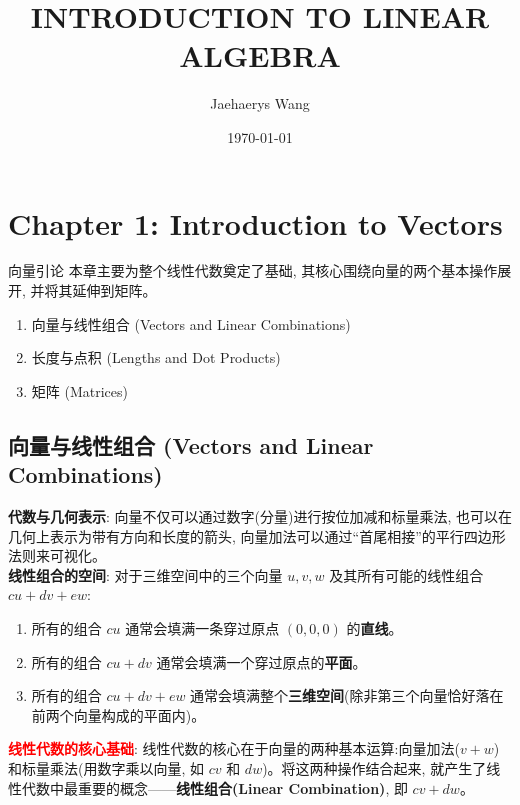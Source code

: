 \documentclass[12pt, a4paper]{ctexart}
\title{INTRODUCTION TO LINEAR ALGEBRA}
\author{Jaehaerys Wang}
\date{\today}
\newcommand{\important}[1]{\textbf{\textcolor{red}{#1}}}
\newcommand{\term}[1]{\textbf{\textcolor{blue!80!black}{#1}}}
\newcommand{\emphb}[1]{\textbf{#1}}
\begin{document}
\maketitle
\newpage

\tableofcontents
\newpage

\section{Chapter 1: Introduction to Vectors}
\begin{chaptersummary}{向量引论}
    本章主要为整个线性代数奠定了基础, 其核心围绕向量的两个基本操作展开, 并将其延伸到矩阵。
    \tcbline %
    \begin{enumerate}[nosep]
        \item 向量与线性组合 (Vectors and Linear Combinations)
        \item 长度与点积 (Lengths and Dot Products)
        \item 矩阵 (Matrices)
    \end{enumerate}
\end{chaptersummary}

\subsection{向量与线性组合 (Vectors and Linear Combinations)}
\emphb{代数与几何表示}: 向量不仅可以通过数字(分量)进行按位加减和标量乘法, 也可以在几何上表示为带有方向和长度的箭头, 向量加法可以通过“首尾相接”的平行四边形法则来可视化。\\
\emphb{线性组合的空间}: 对于三维空间中的三个向量 $u, v, w$ 及其所有可能的线性组合 $cu + dv + ew$:
\begin{enumerate}[nosep]
    \item 所有的组合 $cu$ 通常会填满一条穿过原点 $(0,0,0)$ 的\emphb{直线}。
    \item 所有的组合 $cu + dv$ 通常会填满一个穿过原点的\emphb{平面}。
    \item 所有的组合 $cu + dv + ew$ 通常会填满整个\emphb{三维空间}(除非第三个向量恰好落在前两个向量构成的平面内)。
\end{enumerate}
\important{线性代数的核心基础}: 线性代数的核心在于向量的两种基本运算:向量加法($v + w$)和标量乘法(用数字乘以向量, 如 $cv$ 和 $dw$)。将这两种操作结合起来, 就产生了线性代数中最重要的概念——\term{线性组合(Linear Combination)}, 即 $cv + dw$。
\end{document}
